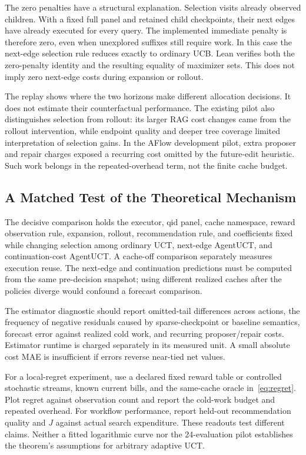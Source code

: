 The zero penalties have a structural explanation. Selection visits already observed children. With a fixed full panel and retained child checkpoints, their next edges have already executed for every query. The implemented immediate penalty is therefore zero, even when unexplored suffixes still require work. In this case the next-edge selection rule reduces exactly to ordinary UCB. Lean verifies both the zero-penalty identity and the resulting equality of maximizer sets. This does not imply zero next-edge costs during expansion or rollout.

The replay shows where the two horizons make different allocation decisions. It does not estimate their counterfactual performance. The existing pilot also distinguishes selection from rollout: its larger RAG cost changes came from the rollout intervention, while endpoint quality and deeper tree coverage limited interpretation of selection gains. In the AFlow development pilot, extra proposer and repair charges exposed a recurring cost omitted by the future-edit heuristic. Such work belongs in the repeated-overhead term, not the finite cache budget.

\subsection{A Matched Test of the Theoretical Mechanism}
The decisive comparison holds the executor, qid panel, cache namespace, reward observation rule, expansion, rollout, recommendation rule, and coefficients fixed while changing selection among ordinary UCT, next-edge AgentUCT, and continuation-cost AgentUCT. A cache-off comparison separately measures execution reuse. The next-edge and continuation predictions must be computed from the same pre-decision snapshot; using different realized caches after the policies diverge would confound a forecast comparison.

The estimator diagnostic should report omitted-tail differences across actions, the frequency of negative residuals caused by sparse-checkpoint or baseline semantics, forecast error against realized cold work, and recurring proposer/repair costs. Estimator runtime is charged separately in its measured unit. A small absolute cost MAE is insufficient if errors reverse near-tied net values.

For a local-regret experiment, use a declared fixed reward table or controlled stochastic streams, known current bills, and the same-cache oracle in~\eqref{eq:regret}. Plot regret against observation count and report the cold-work budget and repeated overhead. For workflow performance, report held-out recommendation quality and $J$ against actual search expenditure. These readouts test different claims. Neither a fitted logarithmic curve nor the 24-evaluation pilot establishes the theorem's assumptions for arbitrary adaptive UCT.
